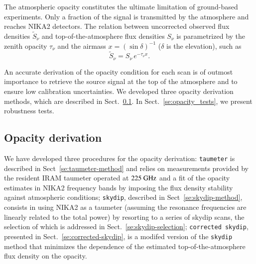 
The atmospheric opacity constitutes the ultimate limitation of
ground-based experiments. Only a fraction of the
signal is transmitted by the atmosphere and reaches NIKA2 detectors. 
The relation between uncorrected observed flux densities
$\tilde{S}_{\nu}$ and top-of-the-atmosphere flux densities $S_{\nu}$
is parametrized by the zenith opacity $\tau_{\nu}$
and the airmass $x = \left(\sin\delta\right)^{-1}$ ($\delta$ is the elevation), such as
\begin{equation}
\tilde{S}_{\nu} = S_{\nu} \, e^{-\tau_{\nu}  x}.
\label{eq:uncorr_flux}
\end{equation}

An accurate derivation of the opacity condition for each scan is
of outmost importance to retrieve the source signal at the top of the
atmosphere and to ensure low calibration uncertainties.
We developed three opacity derivation methods, which are described in
Sect.~\ref{se:opacity_methods}. In Sect.~\ref{se:opacity_tests}, we
present robustness tests.

\subsection{Opacity derivation}
\label{se:opacity_methods}

We have developed
three procedures for the opacity derivation: {\tt taumeter} is
described in Sect~\ref{se:taumeter-method} and relies on measurements
provided by the resident IRAM taumeter operated at $225~\rm{GHz}$ and
a fit of the opacity estimates in NIKA2 frequency bands by imposing
the flux density stability against atmospheric conditions;
{\tt skydip}, described in Sect~\ref{se:skydip-method}, consists in
using NIKA2 as a taumeter (assuming the resonance frequencies are
linearly related to the total power) by resorting to a series of
skydip scans, the selection of which is addressed in
Sect.~\ref{se:skydip-selection}; {\tt corrected skydip}, presented in
Sect.~\ref{se:corrected-skydip}, is a modifed
version of the {\tt skydip} method that minimizes the dependence of the
estimated top-of-the-atmosphere flux density on the opacity.

